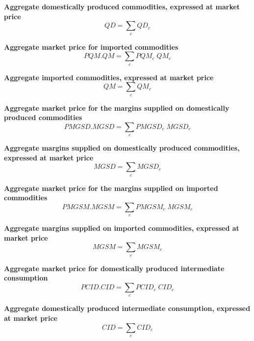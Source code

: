 \documentclass[12pt]{article}
\numberwithin{equation}{section}
\begin{document}
\noindent \textbf{Aggregate domestically produced commodities, expressed at market price} 
\begin{dmath}
QD = \sum_{c} QD_{c}
\label{SU.mdlQD}
\end{dmath}

\noindent \textbf{Aggregate market price for imported commodities} 
\begin{dmath}
PQM . QM = \sum_{c} PQM_{c} \; QM_{c}
\label{SU.mdlPQM}
\end{dmath}

\noindent \textbf{Aggregate imported commodities, expressed at market price} 
\begin{dmath}
QM = \sum_{c} QM_{c}
\label{SU.mdlQM}
\end{dmath}

\noindent \textbf{Aggregate market price for the margins supplied on domestically produced commodities} 
\begin{dmath}
PMGSD . MGSD = \sum_{c} PMGSD_{c} \; MGSD_{c}
\label{SU.mdlPMGSD}
\end{dmath}

\noindent \textbf{Aggregate margins supplied on domestically produced commodities, expressed at market price} 
\begin{dmath}
MGSD = \sum_{c} MGSD_{c}
\label{SU.mdlMGSD}
\end{dmath}

\noindent \textbf{Aggregate market price for the margins supplied on imported commodities} 
\begin{dmath}
PMGSM . MGSM = \sum_{c} PMGSM_{c} \; MGSM_{c}
\label{SU.mdlPMGSM}
\end{dmath}

\noindent \textbf{Aggregate margins supplied on imported commodities, expressed at market price} 
\begin{dmath}
MGSM = \sum_{c} MGSM_{c}
\label{SU.mdlMGSM}
\end{dmath}

\noindent \textbf{Aggregate market price for domestically produced intermediate consumption} 
\begin{dmath}
PCID . CID = \sum_{c} PCID_{c} \; CID_{c}
\label{SU.mdlPCID}
\end{dmath}

\noindent \textbf{Aggregate domestically produced intermediate consumption, expressed at market price} 
\begin{dmath}
CID = \sum_{c} CID_{c}
\label{SU.mdlCID}
\end{dmath}
\end{document}
